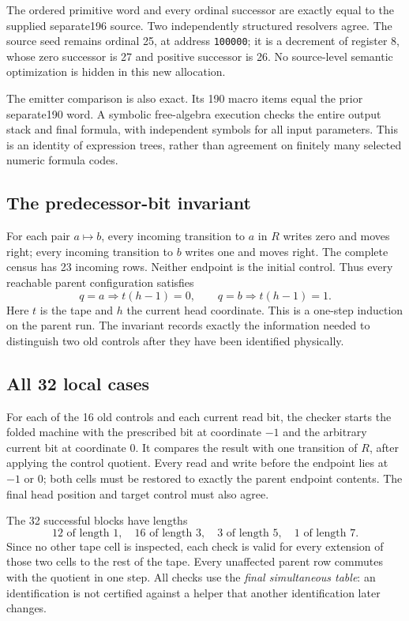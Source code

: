 \documentclass[11pt,letterpaper]{article}
\newcommand{\code}[1]{\texttt{#1}}
\begin{document}
The ordered primitive word and every ordinal successor are exactly
equal to the supplied separate196 source. Two independently structured
resolvers agree. The source seed remains ordinal 25, at address
\code{100000}; it is a decrement of register 8, whose zero successor
is 27 and positive successor is 26. No source-level semantic
optimization is hidden in this new allocation.

The emitter comparison is also exact. Its 190 macro items equal the
prior separate190 word. A symbolic free-algebra execution checks the
entire output stack and final formula, with independent symbols for
all input parameters. This is an identity of expression trees, rather
than agreement on finitely many selected numeric formula codes.

\subsection{The predecessor-bit invariant}
For each pair $a\mapsto b$, every incoming transition to $a$ in $R$
writes zero and moves right; every incoming transition to $b$ writes
one and moves right. The complete census has 23 incoming rows. Neither
endpoint is the initial control. Thus every reachable parent
configuration satisfies
\[
q=a\Longrightarrow t(h-1)=0,\qquad
q=b\Longrightarrow t(h-1)=1.
\]
Here $t$ is the tape and $h$ the current head coordinate. This is a
one-step induction on the parent run. The invariant records exactly
the information needed to distinguish two old controls after they
have been identified physically.

\subsection{All 32 local cases}
For each of the 16 old controls and each current read bit, the checker
starts the folded machine with the prescribed bit at coordinate $-1$
and the arbitrary current bit at coordinate 0. It compares the result
with one transition of $R$, after applying the control quotient.
Every read and write before the endpoint lies at $-1$ or 0; both cells
must be restored to exactly the parent endpoint contents. The final
head position and target control must also agree.

The 32 successful blocks have lengths
\[
12\text{ of length }1,\quad16\text{ of length }3,\quad
3\text{ of length }5,\quad1\text{ of length }7.
\]
Since no other tape cell is inspected, each check is valid for every
extension of those two cells to the rest of the tape. Every unaffected
parent row commutes with the quotient in one step. All checks use the
\emph{final simultaneous table}: an identification is not certified
against a helper that another identification later changes.
\end{document}
